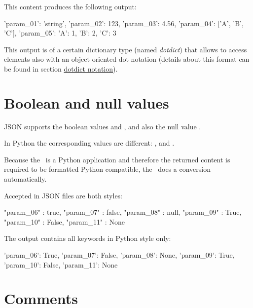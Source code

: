 This content produces the following output:

\begin{pythonlog}
{'param_01': 'string',
 'param_02': 123,
 'param_03': 4.56,
 'param_04': ['A', 'B', 'C'],
 'param_05': {'A': 1, 'B': 2, 'C': 3}}
\end{pythonlog}

This output is of a certain dictionary type (named \textit{dotdict}) that allows to access elements also with an object oriented dot notation
(details about this format can be found in section \hyperref[dotdict-notation]{dotdict notation}).


\newpage

\section{Boolean and null values}

JSON supports the boolean values  and , and also the null value .

In Python the corresponding values are different: ,  and .

Because the \pkg\ is a Python application and therefore the returned content is required to be formatted Python compatible,
the \pkg\ does a conversion automatically.

Accepted in JSON files are both styles:

\begin{pythoncode}
{
   "param_06" : true,
   "param_07" : false,
   "param_08" : null,
   "param_09" : True,
   "param_10" : False,
   "param_11" : None
}
\end{pythoncode}

The output contains all keywords in Python style only:

\begin{pythonlog}
{'param_06': True,
 'param_07': False,
 'param_08': None,
 'param_09': True,
 'param_10': False,
 'param_11': None}
\end{pythonlog}



\newpage

\section{Comments}


